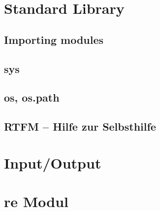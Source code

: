 \documentclass{beamer}
\begin{document}
\section{Standard Library}
\subsection{Importing modules}
\subsection{sys} 
\subsection{os, os.path} 
\subsection{RTFM -- Hilfe zur Selbsthilfe}  

\section{Input/Output } 

\section{re Modul}
\end{document}
